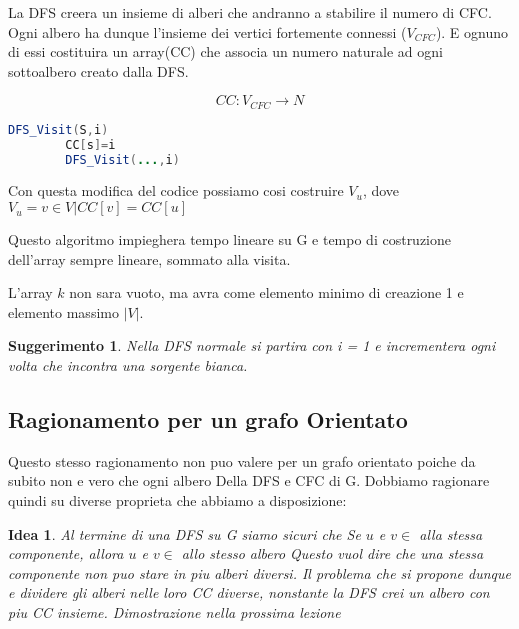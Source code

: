 La DFS creera un insieme di alberi che andranno a stabilire il numero di CFC.
Ogni albero ha dunque l'insieme dei vertici fortemente connessi ($V_{CFC}$). E ognuno di essi costituira un array(CC) che associa un numero naturale ad ogni sottoalbero creato dalla DFS.

$$CC : V_{CFC} \rightarrow N$$


\begin{lstlisting}[language=Java]
	DFS_Visit(S,i)
		CC[s]=i
		DFS_Visit(...,i)
\end{lstlisting}

Con questa modifica del codice possiamo cosi costruire $V_{u}$, dove $V_u = {v \in V | CC[v] = CC[u]}$


Questo algoritmo impieghera tempo lineare su G e tempo di costruzione dell'array sempre lineare, sommato alla visita.

L'array $k$ non sara vuoto, ma avra come elemento minimo di creazione 1 e elemento massimo $|V|$.

\newtheorem{consCFCnonorientato}{Suggerimento}

\begin{consCFCnonorientato}
	Nella DFS normale si partira con i = 1 e incrementera ogni volta che incontra una sorgente bianca.
\end{consCFCnonorientato}

\subsection{Ragionamento per un grafo Orientato}
Questo stesso ragionamento non puo valere per un grafo orientato poiche da subito non e vero che ogni albero Della DFS e CFC di G.
Dobbiamo ragionare quindi su diverse proprieta che abbiamo a disposizione:
\newtheorem{ideaorientato}{Idea}
\begin{ideaorientato}
	\item Al termine di una DFS su G siamo sicuri che 
		\subitem Se $u$ e $v \in$ alla stessa componente, allora $u$ e $v \in$  allo stesso albero
		Questo vuol dire che una stessa componente non puo stare in piu alberi diversi. Il problema che si propone dunque e dividere gli alberi nelle loro CC diverse, nonstante la DFS crei un albero con piu CC insieme.
		Dimostrazione nella prossima lezione
\end{ideaorientato}


